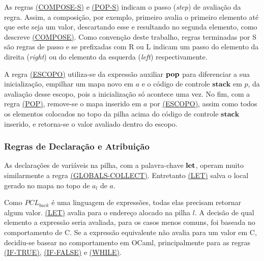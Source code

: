As regras \hyperref[rule:pop-s]{(COMPOSE-S)} e \hyperref[rule:compose-s]{(POP-S)} indicam o passo (\emph{step}) de avaliação da regra. Assim, a composição, por exemplo, primeiro avalia o primeiro elemento até que este seja um valor, descartando esse e resultando no segunda elemento, como descreve \hyperref[rule:compose]{(COMPOSE)}. Como convenção deste trabalho, regras terminadas por S são regras de passo e se prefixadas com R ou L indicam um passo do elemento da direita (\emph{right}) ou do elemento da esquerda (\emph{left}) respectivamente.

A regra \hyperref[rule:escopo]{(ESCOPO)} utiliza-se da expressão auxiliar $\mathbf{pop}$ para diferenciar a sua inicialização, empilhar um mapa novo em $a$ e o código de controle $\mathbf{stack}$ em $p$, da avaliação desse escopo, pois a inicialização só acontece uma vez. No fim, com a regra \hyperref[rule:pop]{(POP)}, remove-se o mapa inserido em $a$ por \hyperref[rule:escopo]{(ESCOPO)}, assim como todos os elementos colocados no topo da pilha acima do código de controle $\mathbf{stack}$ inserido, e retorna-se o valor avaliado dentro do escopo.

\subsubsection{Regras de Declaração e Atribuição}

As declarações de variáveis na pilha, com a palavra-chave $\mathbf{let}$, operam muito similarmente a regra \hyperref[rule:globals-collect]{(GLOBALS-COLLECT)}. Entretanto \hyperref[rule:let]{(LET)} salva o local gerado no mapa no topo de $a_l$ de $a$. 


Como $PCL_{back}$ é uma linguagem de expressões, todas elas precisam retornar algum valor. \hyperref[rule:let]{(LET)} avalia para o endereço alocado na pilha $l$. A decisão de qual elemento a expressão seria avaliada, para os casos menos comuns, foi baseada no comportamento de C. Se a expressão equivalente não avalia para um valor em C, decidiu-se basear no comportamento em OCaml, principalmente para as regras \hyperref[rule:if-true]{(IF-TRUE)}, \hyperref[rule:if-false]{(IF-FALSE)} e \hyperref[rule:while]{(WHILE)}.

